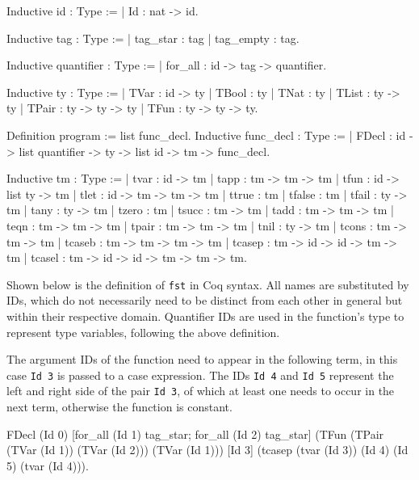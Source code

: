 \documentclass[paper = a4, fleqn, abstract=on, twoside]{scrreprt}
\newcommand{\coqinline}[1]{\texttt{#1}}
\begin{document}
\begin{flushleft}
\begin{minipage}[t]{.45 \linewidth}
\begin{coqcode}
Inductive id : Type :=
  | Id : nat -> id.

Inductive tag : Type :=
  | tag_star  : tag
  | tag_empty : tag.

Inductive quantifier : Type :=
  | for_all : id -> tag -> quantifier.

Inductive ty : Type :=
  | TVar  : id -> ty
  | TBool : ty
  | TNat  : ty
  | TList : ty -> ty
  | TPair : ty -> ty -> ty
  | TFun  : ty -> ty -> ty.

Definition program := list func_decl.
Inductive func_decl : Type :=
  | FDecl : id -> list quantifier ->
    ty -> list id -> tm -> func_decl.
\end{coqcode}
\end{minipage}
\hfill
\vrule
\vspace{.5 em}
\begin{minipage}[t]{.5 \linewidth}
	\begin{coqcode}
Inductive tm : Type :=
  | tvar   : id -> tm
  | tapp   : tm -> tm -> tm
  | tfun   : id -> list ty -> tm
  | tlet   : id -> tm -> tm -> tm
  | ttrue  : tm
  | tfalse : tm
  | tfail  : ty -> tm
  | tany   : ty -> tm
  | tzero  : tm
  | tsucc  : tm -> tm
  | tadd   : tm -> tm -> tm
  | teqn   : tm -> tm -> tm
  | tpair  : tm -> tm -> tm
  | tnil   : ty -> tm
  | tcons  : tm -> tm -> tm
  | tcaseb : tm -> tm -> tm -> tm
  | tcasep : tm -> id -> id -> tm ->
             tm
  | tcasel : tm -> id -> id -> tm ->
             tm -> tm.
	\end{coqcode}
\end{minipage}
\end{flushleft}\noindent
Shown below is the definition of \texttt{fst} in Coq syntax. All names are substituted by IDs, which do not necessarily need to be distinct from each other in general but within their respective domain. Quantifier IDs are used in the function's type to represent type variables, following the above definition. \par 
The argument IDs of the function need to appear in the following term, in this case \coqinline{Id 3} is passed to a case expression. The IDs \coqinline{Id 4} and \coqinline{Id 5} represent the left and right side of the pair \coqinline{Id 3}, of which at least one needs to occur in the next term, otherwise the function is constant.
\begin{coqcode}
FDecl (Id 0) 
      [for_all (Id 1) tag_star; for_all (Id 2) tag_star] 
      (TFun (TPair (TVar (Id 1)) (TVar (Id 2))) (TVar (Id 1)))
      [Id 3]
      (tcasep (tvar (Id 3)) (Id 4) (Id 5) (tvar (Id 4))).
\end{coqcode}
\end{document}
